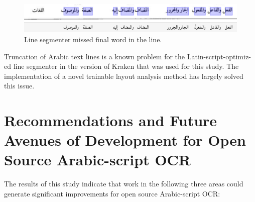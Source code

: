 \begin{figure}[h]
	\centering
	\includegraphics[width=\linewidth]{images/image4.png}
	\caption{Line segmenter missed final word in the line.}
	\label{fig3:fig31}
\end{figure} 

Truncation of Arabic text lines is a known problem for the
Latin-script-op\-tim\-iz-ed line segmenter in the version of Kraken that was used
for this study. The implementation of a novel trainable layout analysis method
has largely solved this issue\cite{kiessling2019badam}.

\section{Recommendations and Future Avenues of Development for Open Source Arabic-script OCR}

The results of this study indicate that work in the following three areas could
generate significant improvements for open source Arabic-script OCR: 

